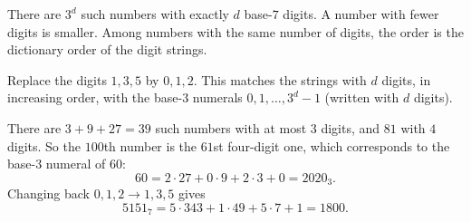 There are $3^d$ such numbers with exactly $d$ base-$7$ digits. A number with fewer digits is smaller. Among numbers with the same number of digits, the order is the dictionary order of the digit strings.

Replace the digits $1,3,5$ by $0,1,2$. This matches the strings with $d$ digits, in increasing order, with the base-$3$ numerals $0,1,\dots,3^d-1$ (written with $d$ digits).

There are $3+9+27=39$ such numbers with at most $3$ digits, and $81$ with $4$ digits. So the $100$th number is the $61$st four-digit one, which corresponds to the base-$3$ numeral of $60$:
\[
60=2\cdot27+0\cdot9+2\cdot3+0=2020_3 .
\]
Changing back $0,1,2\to1,3,5$ gives
\[
\boxed{5151_7}=5\cdot343+1\cdot49+5\cdot7+1=\boxed{1800}.
\]
